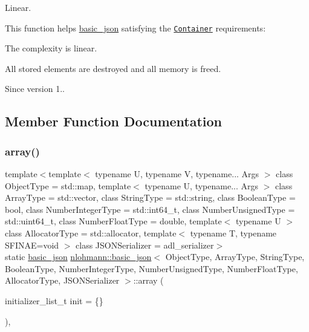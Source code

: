 Linear.

This function helps {\ttfamily \mbox{\hyperlink{classnlohmann_1_1basic__json}{basic\+\_\+json}}} satisfying the \href{http://en.cppreference.com/w/cpp/concept/Container}{\tt Container} requirements\+:
\begin{DoxyItemize}
\item The complexity is linear.
\item All stored elements are destroyed and all memory is freed.
\end{DoxyItemize}

\begin{DoxySince}{Since}
version 1.. 
\end{DoxySince}


\subsection{Member Function Documentation}
\mbox{\label{classnlohmann_1_1basic__json_aa80485befaffcadaa39965494e0b4d2e}} 
\subsubsection{\texorpdfstring{array()}{array()}}
{\footnotesize\ttfamily template$<$template$<$ typename U, typename V, typename... Args $>$ class Object\+Type = std\+::map, template$<$ typename U, typename... Args $>$ class Array\+Type = std\+::vector, class String\+Type  = std\+::string, class Boolean\+Type  = bool, class Number\+Integer\+Type  = std\+::int64\+\_\+t, class Number\+Unsigned\+Type  = std\+::uint64\+\_\+t, class Number\+Float\+Type  = double, template$<$ typename U $>$ class Allocator\+Type = std\+::allocator, template$<$ typename T, typename S\+F\+I\+N\+A\+E=void $>$ class J\+S\+O\+N\+Serializer = adl\+\_\+serializer$>$ \\
static \mbox{\hyperlink{classnlohmann_1_1basic__json}{basic\+\_\+json}} \mbox{\hyperlink{classnlohmann_1_1basic__json}{nlohmann\+::basic\+\_\+json}}$<$ Object\+Type, Array\+Type, String\+Type, Boolean\+Type, Number\+Integer\+Type, Number\+Unsigned\+Type, Number\+Float\+Type, Allocator\+Type, J\+S\+O\+N\+Serializer $>$\+::array (\begin{DoxyParamCaption}\item[{initializer\+\_\+list\+\_\+t}]{init = {\ttfamily \{\}} }\end{DoxyParamCaption})\hspace{0.3cm}{\ttfamily [inline]}, {\ttfamily [static]}}



